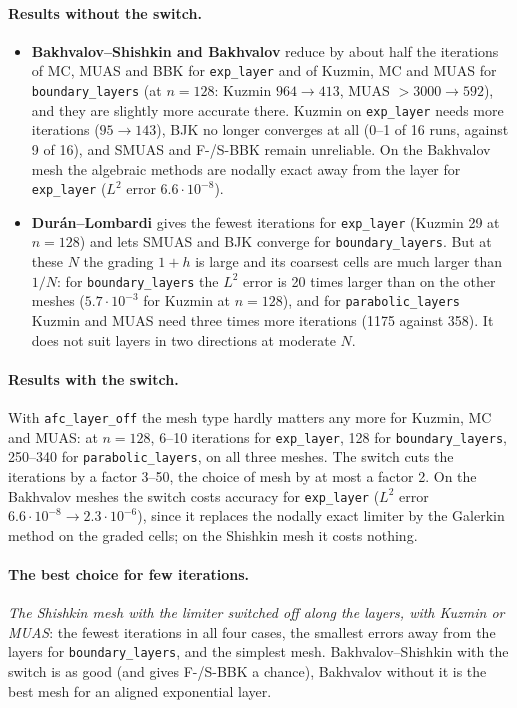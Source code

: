 \documentclass[11pt]{article}
\begin{document}
\paragraph{Results without the switch.}
\begin{itemize}[leftmargin=*]
\item \textbf{Bakhvalov--Shishkin and Bakhvalov} reduce by about half the iterations of MC, MUAS and BBK for
  \texttt{exp\_layer} and of
  Kuzmin, MC and MUAS for \texttt{boundary\_layers} (at $n=128$: Kuzmin $964\to413$, MUAS $>3000\to592$), and they
  are slightly more accurate there. Kuzmin on \texttt{exp\_layer} needs more iterations ($95\to143$), BJK no longer
  converges at all (0--1 of 16 runs, against 9 of 16), and SMUAS and F-/S-BBK remain unreliable. On the Bakhvalov mesh the
  algebraic methods are nodally exact away from the layer for \texttt{exp\_layer} ($L^2$ error $6.6\cdot10^{-8}$).
\item \textbf{Dur\'an--Lombardi} gives the fewest iterations for \texttt{exp\_layer} (Kuzmin 29 at $n=128$) and lets SMUAS
  and BJK converge for \texttt{boundary\_layers}. But at these $N$ the grading $1+h$ is large and its coarsest cells are
  much larger than $1/N$: for \texttt{boundary\_layers} the $L^2$ error is 20 times larger than on the other meshes
  ($5.7\cdot10^{-3}$ for Kuzmin at $n=128$), and for \texttt{parabolic\_layers} Kuzmin and MUAS need three times more
  iterations (1175 against 358). It does not suit layers in two directions at moderate $N$.
\end{itemize}

\paragraph{Results with the switch.} With \texttt{afc\_layer\_off} the mesh type hardly matters any more for Kuzmin,
MC and MUAS: at $n=128$, 6--10 iterations for \texttt{exp\_layer}, 128 for \texttt{boundary\_layers}, 250--340 for
\texttt{parabolic\_layers}, on all three meshes. The switch cuts the iterations by a factor 3--50, the choice of mesh by
at most a factor 2. On the Bakhvalov meshes the switch costs accuracy for \texttt{exp\_layer} ($L^2$ error
$6.6\cdot10^{-8}\to2.3\cdot10^{-6}$), since it replaces the nodally exact limiter by the Galerkin method on the graded
cells; on the Shishkin mesh it costs nothing.

\paragraph{The best choice for few iterations.} \emph{The Shishkin mesh with the limiter switched off along the layers,
with Kuzmin or MUAS}: the fewest iterations in all four cases, the smallest errors away from the layers for
\texttt{boundary\_layers}, and the simplest mesh. Bakhvalov--Shishkin with the switch is as good (and gives F-/S-BBK a
chance), Bakhvalov without it is the best mesh for an aligned exponential layer.
\end{document}
